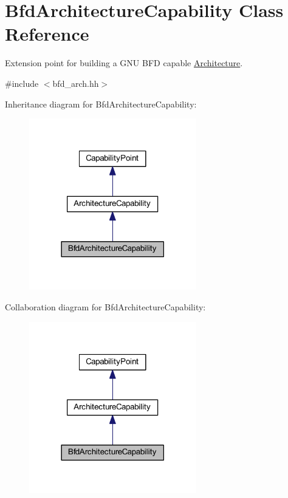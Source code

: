 \hypertarget{class_bfd_architecture_capability}{}\section{Bfd\+Architecture\+Capability Class Reference}
\label{class_bfd_architecture_capability}


Extension point for building a G\+NU B\+FD capable \mbox{\hyperlink{class_architecture}{Architecture}}.  




{\ttfamily \#include $<$bfd\+\_\+arch.\+hh$>$}



Inheritance diagram for Bfd\+Architecture\+Capability\+:
\nopagebreak
\begin{figure}[H]
\begin{center}
\leavevmode
\includegraphics[width=206pt]{class_bfd_architecture_capability__inherit__graph}
\end{center}
\end{figure}


Collaboration diagram for Bfd\+Architecture\+Capability\+:
\nopagebreak
\begin{figure}[H]
\begin{center}
\leavevmode
\includegraphics[width=206pt]{class_bfd_architecture_capability__coll__graph}
\end{center}
\end{figure}
